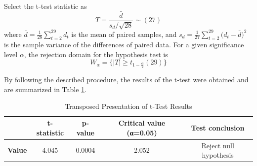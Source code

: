 \documentclass{mcmthesis}
\begin{document}
	Select the t-test statistic as
	\begin{equation*}
		T=\frac{ \bar{d} }{ s_d\slash \sqrt{28} } \sim (27)
	\end{equation*}
	where $\bar{d}=\frac{1}{28} \sum_{t=2}^{29} d_t$ is the mean of paired samples, 
	and $ s_d = \frac{1}{27} \sum_{t=2}^{29}\big( d_t - \bar{d} \big)^2 $ is the sample variance of the differences of paired data. 
	For a given significance level $\alpha$, the rejection domain for the hypothesis test is
	\begin{equation*}
		W_\alpha = \big\{ |T| \ge t_{1-\frac{\alpha}{2}}(29) \big\}
	\end{equation*}
	
	By following the described procedure, the results of the t-test were obtained and are summarized in Table \ref{1}.


\begin{table}[H]
	\centering
	\caption{Transposed Presentation of t-Test Results}
	\label{table:H_t-test_result_transposed}
	\begin{tabular}{lcccc}
		\toprule
		\rowcolor{red!10}
		& \textbf{t-statistic} & \textbf{p-value} & \textbf{Critical value (α=0.05)} & \textbf{Test conclusion} \\
		\midrule
		\rowcolor{white} %
		\textbf{Value} & 4.045 & 0.0004 & 2.052 & Reject null hypothesis \\
		\bottomrule
	\end{tabular}
	\label{1}
\end{table}
	
\end{document}
